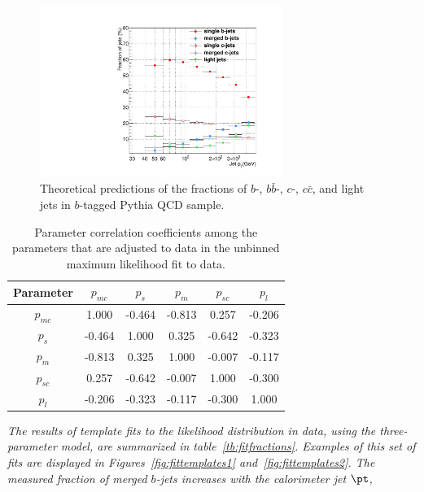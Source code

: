 \begin{figure}[tp]
\centering
\includegraphics[width=0.70\textwidth]{TrueFractions_NominalPythia.pdf}
\caption{Theoretical predictions of the fractions of $b$-, $b\bar{b}$-, $c$-, $c\bar{c}$, and light jets in $b$-tagged {\sc Pythia} QCD sample.}
\label{fig:truefractions}
\end{figure}




\begin{table}[!hbt] %
\renewcommand{\arraystretch}{1.2}
\centering
\begin{tabular}{ | c | c | c | c | c | c |}
\hline
  Parameter & $p_{mc}$  & $p_s$  & $p_m$  & $p_{sc}$  &  $p_l$ \\ \hline
  $p_{mc}$   & 1.000 &-0.464 &-0.813&  0.257 &-0.206 \\ \hline
  $p_s$     & -0.464 & 1.000 & 0.325& -0.642 &-0.323 \\ \hline
  $p_m$     &-0.813 & 0.325 & 1.000& -0.007& -0.117 \\ \hline
  $p_{sc}$   &0.257 &-0.642 &-0.007 & 1.000 &-0.300 \\ \hline
  $p_l$      & -0.206& -0.323 &-0.117 &-0.300 & 1.000 \\ \hline
\end{tabular}
\caption{Parameter correlation coefficients among the parameters that are adjusted to data in the unbinned maximum likelihood fit to data.}
\label{tb:correlations}
\end{table}

\emph{The results of template fits to the likelihood distribution in data, using the three-parameter model, are summarized in table~\ref{tb:fitfractions}. Examples of this set of fits are displayed in Figures~\ref{fig:fittemplates1} and~\ref{fig:fittemplates2}. The measured fraction of merged $b$-jets increases with the calorimeter jet $\pt$,}

